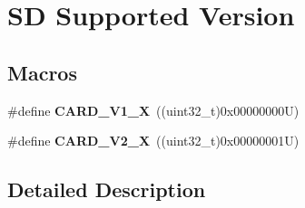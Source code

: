 \hypertarget{group___s_d___exported___constansts___group4}{}\section{SD Supported Version}
\label{group___s_d___exported___constansts___group4}
\subsection*{Macros}
\begin{DoxyCompactItemize}
\item 
\mbox{\label{group___s_d___exported___constansts___group4_ga40af3ae2c5afcee316a3841cc214f118}} 
\#define {\bfseries C\+A\+R\+D\+\_\+\+V1\+\_\+X}~((uint32\+\_\+t)0x00000000\+U)
\item 
\mbox{\label{group___s_d___exported___constansts___group4_gaa4af7e532d46f84fd7bbcb88668e9dff}} 
\#define {\bfseries C\+A\+R\+D\+\_\+\+V2\+\_\+X}~((uint32\+\_\+t)0x00000001\+U)
\end{DoxyCompactItemize}


\subsection{Detailed Description}

